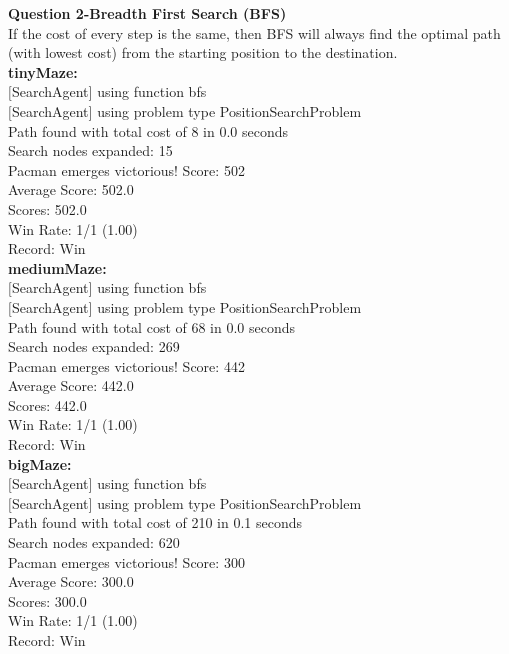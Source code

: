 \documentclass[11pt]{article}
\begin{document}
\newpage
\noindent
\textbf{Question 2-Breadth First Search (BFS)}\\
If the cost of every step is the same, then BFS will always find the optimal path (with lowest cost) from the starting position to the destination.\\

\noindent
\textbf{tinyMaze:}\\
$[$SearchAgent$]$ using function bfs\\
$[$SearchAgent$]$ using problem type PositionSearchProblem\\
Path found with total cost of 8 in 0.0 seconds\\
Search nodes expanded: 15\\
Pacman emerges victorious! Score: 502\\
Average Score: 502.0\\
Scores:        502.0\\
Win Rate:      1/1 (1.00)\\
Record:        Win\\

\noindent
\textbf{mediumMaze:}\\
$[$SearchAgent$]$ using function bfs\\
$[$SearchAgent$]$ using problem type PositionSearchProblem\\
Path found with total cost of 68 in 0.0 seconds\\
Search nodes expanded: 269\\
Pacman emerges victorious! Score: 442\\
Average Score: 442.0\\
Scores:        442.0\\
Win Rate:      1/1 (1.00)\\
Record:        Win\\

\noindent
\textbf{bigMaze:}\\
$[$SearchAgent$]$ using function bfs\\
$[$SearchAgent$]$ using problem type PositionSearchProblem\\
Path found with total cost of 210 in 0.1 seconds\\
Search nodes expanded: 620\\
Pacman emerges victorious! Score: 300\\
Average Score: 300.0\\
Scores:        300.0\\
Win Rate:      1/1 (1.00)\\
Record:        Win\\
\end{document}

